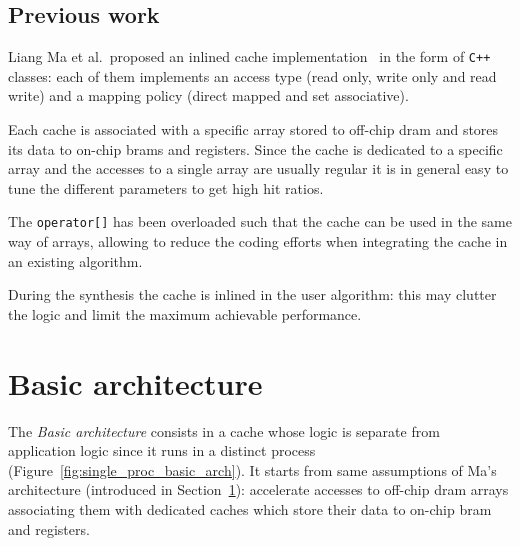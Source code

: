 \documentclass[11pt,a4paper,oneside]{memoir}
\begin{document}

\section{Previous work}\label{sec:liang}
Liang Ma et al.\ proposed an inlined cache implementation~\cite{liang} in the
form of \texttt{C++} classes: each of them implements an access type (read
only, write only and read write) and a mapping policy (direct mapped and set
associative).

Each cache is associated with a specific array stored to off-chip \ac{dram} and
stores its data to on-chip \acp{bram} and registers. Since the cache is
dedicated to a specific array and the accesses to a single array are usually
regular it is in general easy to tune the different parameters to get high hit
ratios.

The \texttt{operator[]} has been overloaded such that the cache can be used in
the same way of arrays, allowing to reduce the coding efforts when integrating
the cache in an existing algorithm.

During the synthesis the cache is inlined in the user algorithm: this may
clutter the logic and limit the maximum achievable performance.

\chapter{Basic architecture}
The \emph{Basic architecture} consists in a cache whose logic is separate from
application logic since it runs in a distinct process
(Figure~\ref{fig:single_proc_basic_arch}).
It starts from same assumptions of Ma's architecture (introduced in
Section~\ref{sec:liang}): accelerate accesses to off-chip \ac{dram} arrays
associating them with dedicated caches which store their data to on-chip
\ac{bram} and registers.
\end{document}
